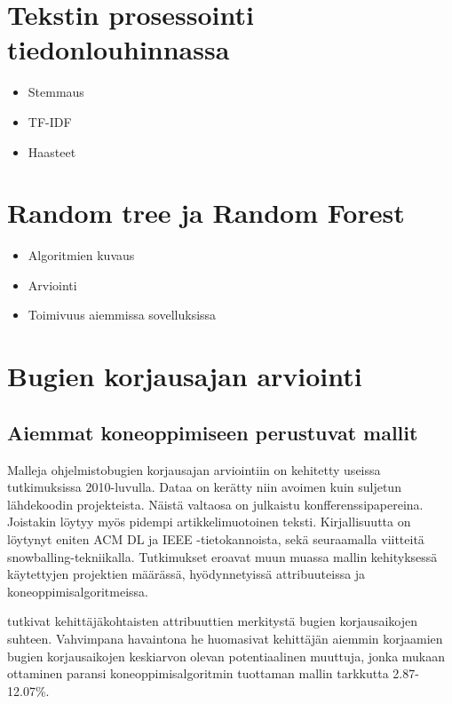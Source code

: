 \documentclass[utf8]{gradu3}
\begin{document}
\section{Tekstin prosessointi tiedonlouhinnassa}
 \begin{itemize}
   \item Stemmaus
   \item TF-IDF
   \item Haasteet
 \end{itemize}
\section{Random tree ja Random Forest}
\begin{itemize}
  \item Algoritmien kuvaus
  \item Arviointi
  \item Toimivuus aiemmissa sovelluksissa
\end{itemize}

\section{Bugien korjausajan arviointi}


\subsection{Aiemmat koneoppimiseen perustuvat mallit}
Malleja ohjelmistobugien korjausajan arviointiin on kehitetty useissa
tutkimuksissa 2010-luvulla. Dataa on kerätty niin avoimen kuin suljetun
lähdekoodin projekteista. Näistä valtaosa on julkaistu konfferenssipapereina.
Joistakin löytyy myös pidempi artikkelimuotoinen teksti. Kirjallisuutta on
löytynyt eniten ACM DL ja IEEE -tietokannoista, sekä seuraamalla viitteitä
snowballing-tekniikalla. Tutkimukset eroavat muun muassa mallin kehityksessä
käytettyjen projektien määrässä, hyödynnetyissä attribuuteissa ja
koneoppimisalgoritmeissa.

\textcite{Anh-2011} tutkivat kehittäjäkohtaisten attribuuttien merkitystä bugien
korjausaikojen suhteen. Vahvimpana havaintona he huomasivat kehittäjän aiemmin
korjaamien bugien korjausaikojen keskiarvon olevan potentiaalinen muuttuja,
jonka mukaan ottaminen paransi koneoppimisalgoritmin tuottaman mallin tarkkutta
2.87-12.07\%.
\end{document}
